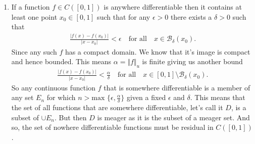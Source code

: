 \documentclass[11pt,letter]{article}
\begin{document}
\begin{enumerate}
\begin{enumerate}
        \item If a function $f \in C([0,1])$ is anywhere differentiable then it contains at least one point $x_0 \in [0,1]$ such that for any $\epsilon > 0$ there exists a $\delta > 0$ such that
        \begin{align*}
            \frac{\vert f(x) - f(x_0) \vert}{\vert x - x_0 \vert} < \epsilon \quad \text{for all} \quad x \in \mathcal{B}_\delta(x_0).
        \end{align*}
        Since any such $f$ has a compact domain. We know that it's image is compact and hence bounded. This means $\alpha = \Vert f \Vert_u$ is finite giving us another bound
        \begin{align*}
            \frac{\vert f(x) - f(x_0) \vert}{\vert x - x_0 \vert} < \frac{\alpha}{\delta} \quad \text{for all} \quad x \in [0,1] \setminus \mathcal{B}_\delta(x_0).
        \end{align*}
        So any continuous function $f$ that is somewhere differentiable is a member of any set $E_n$ for which $n > \text{max }\{\epsilon,\frac{\alpha}{\delta}\}$ given a fixed $\epsilon$ and $\delta$. This means that the set of all functions that are somewhere differentiable, let's call it $D$, is a subset of $\cup E_n$. But then $D$ is meager as it is the subset of a meager set. And so, the set of nowhere differentiable functions must be residual in $C([0,1])$.
    \end{enumerate}
\end{enumerate}
\end{document}
